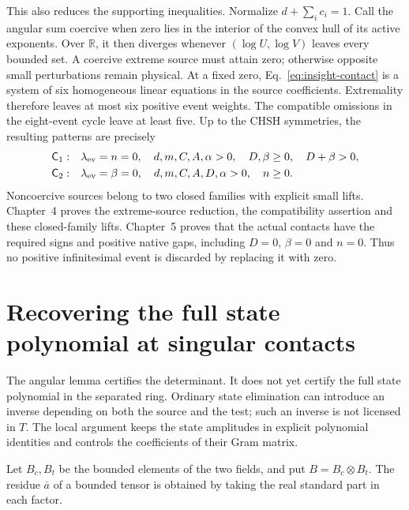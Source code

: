 This also reduces the supporting inequalities. Normalize
$d+\sum_i c_i=1$. Call the angular sum coercive when zero lies in
the interior of the convex hull of its active exponents. Over $\mathbb R$,
it then diverges whenever $(\log U,\log V)$ leaves every bounded set.
A coercive extreme source must attain zero;
otherwise opposite small perturbations remain physical. At a
fixed zero, Eq.~\eqref{eq:insight-contact} is a system of six
homogeneous linear equations in the source coefficients. Extremality
therefore leaves at most six positive event weights. The compatible
omissions in the eight-event cycle leave at least five. Up to the
CHSH symmetries, the resulting patterns are precisely
\begin{equation}\label{eq:insight-two-families}
\begin{aligned}
 \mathsf C_1:&\quad\lambda_{\rm ev}=n=0,\quad
 d,m,C,A,\alpha>0,\quad D,\beta\ge0,\quad D+\beta>0,\\
 \mathsf C_2:&\quad\lambda_{\rm ev}=\beta=0,\quad
 d,m,C,A,D,\alpha>0,\quad n\ge0.
\end{aligned}
\end{equation}
Noncoercive sources belong to two closed families with explicit
small lifts. Chapter~4 proves the extreme-source
reduction, the compatibility assertion and these closed-family
lifts. Chapter~5 proves that the actual contacts have
the required signs and positive native gaps, including $D=0$,
$\beta=0$ and $n=0$. Thus no positive infinitesimal event is
discarded by replacing it with zero.

\section{Recovering the full state polynomial at singular contacts}
\label{sec:insight-normal}

The angular lemma certifies the determinant. It does not yet
certify the full state polynomial in the separated ring. Ordinary
state elimination can introduce an inverse depending on both the
source and the test; such an inverse is not licensed in $T$.
The local argument keeps the state amplitudes in explicit polynomial
identities and controls the coefficients of their Gram matrix.

Let $B_c,B_t$ be the bounded elements of the two fields, and put
$B=B_c\otimes B_t$. The residue $\overline a$ of a bounded tensor
is obtained by taking the real standard part in each factor.

